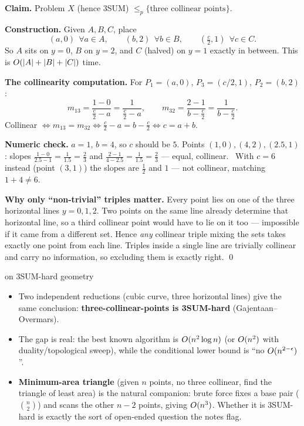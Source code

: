 \begin{correct}
\textbf{Claim.} Problem $X$ (hence 3SUM) $\le_p\{\text{three collinear points}\}$.

\smallskip\noindent\textbf{Construction.} Given $A,B,C$, place
\[
  (a,0)\ \ \forall a\in A,\qquad (b,2)\ \ \forall b\in B,\qquad \left(\tfrac c2,1\right)\ \ \forall c\in C .
\]
So $A$ sits on $y=0$, $B$ on $y=2$, and $C$ (halved) on $y=1$ exactly in between. This is
$O(|A|+|B|+|C|)$ time.

\smallskip\noindent\textbf{The collinearity computation.} For $P_1=(a,0)$, $P_3=(c/2,1)$,
$P_2=(b,2)$:
\[
  m_{13}=\frac{1-0}{\frac c2-a}=\frac{1}{\frac c2-a},
  \qquad
  m_{32}=\frac{2-1}{b-\frac c2}=\frac{1}{b-\frac c2} .
\]
Collinear $\iff m_{13}=m_{32}\iff \frac c2-a=b-\frac c2\iff c=a+b$.

\smallskip\noindent\textbf{Numeric check.} $a=1$, $b=4$, so $c$ should be $5$. Points
$(1,0),(4,2),(2.5,1)$: slopes $\frac{1-0}{2.5-1}=\frac1{1.5}=\frac23$ and
$\frac{2-1}{4-2.5}=\frac1{1.5}=\frac23$ --- equal, collinear. \checkmark\ With $c=6$ instead
(point $(3,1)$) the slopes are $\frac12$ and $1$ --- not collinear, matching $1+4\ne6$.

\smallskip\noindent\textbf{Why only ``non-trivial'' triples matter.} Every point lies on one of
the three horizontal lines $y=0,1,2$. Two points on the same line already determine that
horizontal line, so a third collinear point would have to lie on it too --- impossible if it came
from a different set. Hence \emph{any} collinear triple mixing the sets takes exactly one point
from each line. Triples inside a single line are trivially collinear and carry no information, so
excluding them is exactly right. \qed
\end{correct}

\begin{facts}{on 3SUM-hard geometry}
\begin{itemize}
  \item Two independent reductions (cubic curve, three horizontal lines) give the same
        conclusion: \textbf{three-collinear-points is 3SUM-hard} (Gajentaan--Overmars).
  \item The gap is real: the best known algorithm is $O(n^2\log n)$ (or $O(n^2)$ with
        duality/topological sweep), while the conditional lower bound is ``no
        $O(n^{2-\epsilon})$''.
  \item \textbf{Minimum-area triangle} (given $n$ points, no three collinear, find the triangle
        of least area) is the natural companion: brute force fixes a base pair ($\binom n2$) and
        scans the other $n-2$ points, giving $O(n^3)$. Whether it is 3SUM-hard is exactly the
        sort of open-ended question the notes flag.
\end{itemize}
\end{facts}
